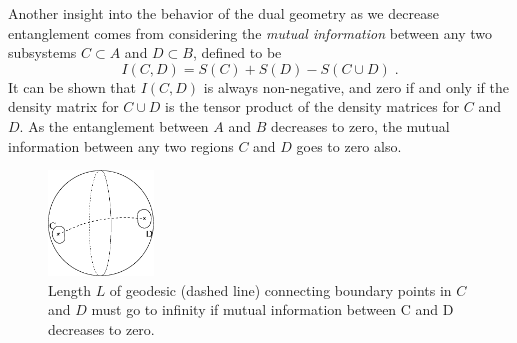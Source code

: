 \documentclass[12pt,epsf]{article}
\renewcommand{\(}{\left(}
\renewcommand{\)}{\right)}
\begin{document}
Another insight into the behavior of the dual geometry as we decrease entanglement comes from considering the {\it mutual information} \cite{nc} between any two subsystems $C \subset A$ and $D \subset B$, defined to be
\[
I(C,D) = S(C) + S(D) - S(C \cup D) \; .
\]
It can be shown that $I(C,D)$ is always non-negative, and zero if and only if the density matrix for $C \cup D$ is the tensor product of the density matrices for $C$ and $D$. As the entanglement between $A$ and $B$ decreases to zero, the mutual information between any two regions $C$ and $D$ goes to zero also.

\begin{figure}
\centering
\includegraphics[width=0.25\textwidth]{mutual.eps}
\caption{Length $L$ of geodesic (dashed line) connecting boundary points in $C$ and $D$ must go to infinity if mutual information between C and D decreases to zero.}
\end{figure}
\end{document}
